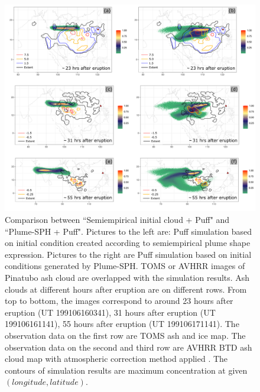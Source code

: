 \documentclass[utf8]{frontiersSCNS} %
\begin{document}
\begin{figure}[!htb]
\centering
\includegraphics[width=0.99 \textwidth]{Figures/bent_plume}
\caption{Comparison between ``Semiempirical initial cloud + Puff" and ``Plume-SPH + Puff". Pictures to the left are: Puff simulation based on initial condition created according to semiempirical plume shape expression. Pictures to the right are Puff simulation based on initial conditions generated by Plume-SPH. TOMS or AVHRR images of Pinatubo ash cloud are overlapped with the simulation results. Ash clouds at different hours after eruption are on different rows. From top to bottom, the images correspond to around 23 hours after eruption (UT 199106160341), 31 hours after eruption (UT 199106161141), 55 hours after eruption (UT 199106171141). The observation data on the first row are TOMS ash and ice map. The observation data on the second and third row are AVHRR BTD ash cloud map with atmospheric correction method applied \citep{guo2004particles}. The contours of simulation results are maximum concentration at given $(longitude, latitude)$.}
\label{fig:Plume-SPH-Puff-ash-cloud}
\end{figure}
\end{document}
